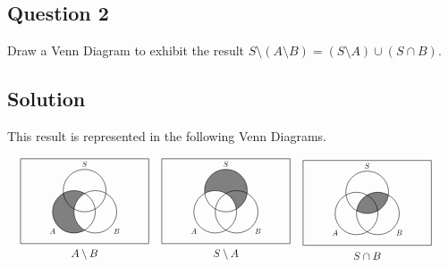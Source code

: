 \documentclass{article}
\begin{document}
\subsection*{Question 2}
    Draw a Venn Diagram to exhibit the result $S \setminus (A \setminus B) = (S \setminus A) \cup (S \cap B).$

\subsection*{Solution}
    This result is represented in the following Venn Diagrams.
    
        \begin{align*}
        &\begin{tikzpicture}[fill=gray, scale = .6, transform shape]
            \scope
            \clip (-3,-2) rectangle (3,2)
                  (.5,-.5) circle (1);
            \fill (-.5,-.5) circle (1);
            \endscope
            \draw (-.5,-.5) circle (1) (-1.5,-1.41) node [text=black] {$A$}
                  (0,.5) circle (1) (0,1.5)  node [text=black, above] {$S$}
                  (.5,-.5) circle (1) (1.5,-1.41) node [text=black] {$B$}
                  (-3,-2) rectangle (3,2)
                  (0, -2.5) node {{\Large $A \setminus B$}};
        \end{tikzpicture} &
        &\begin{tikzpicture}[fill=gray, scale = .6, transform shape]
            \scope
            \clip (-3,-2) rectangle (3,2)
                  (-.5,-.5) circle (1);
            \fill (0,.5) circle (1);
            \endscope
            \draw (-.5,-.5) circle (1) (-1.5,-1.41) node [text=black] {$A$}
                  (0,.5) circle (1) (0,1.5)  node [text=black, above] {$S$}
                  (.5,-.5) circle (1) (1.5,-1.41) node [text=black] {$B$}
                  (-3,-2) rectangle (3,2)
                  (0, -2.5) node {{\Large $S \setminus A$}};
        \end{tikzpicture} &
        &\begin{tikzpicture}[fill=gray, scale = .6, transform shape]
            \scope
            \clip (0,.5) circle (1);
            \fill (.5,-.5) circle (1);
            \endscope
            \draw (-.5,-.5) circle (1) (-1.5,-1.41) node [text=black] {$A$}
                  (0,.5) circle (1) (0,1.5)  node [text=black, above] {$S$}
                  (.5,-.5) circle (1) (1.5,-1.41) node [text=black] {$B$}
                  (-3,-2) rectangle (3,2)
                  (0, -2.5) node {{\Large $S \cap B$}};
        \end{tikzpicture}
        \end{align*}
\end{document}
